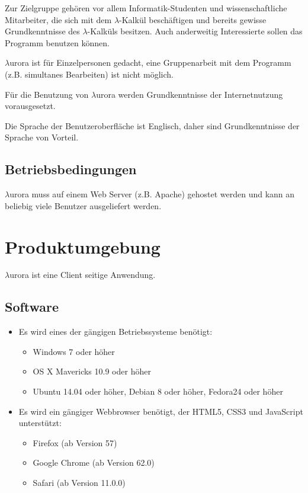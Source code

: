\documentclass[parskip=full,11pt,twoside]{scrartcl}
\begin{document}
Zur Zielgruppe gehören vor allem Informatik-Studenten und wissenschaftliche Mitarbeiter, die sich mit dem $\lambda$-Kalkül beschäftigen und bereits gewisse Grundkenntnisse des $\lambda$-Kalküls besitzen. Auch anderweitig Interessierte sollen das Programm benutzen können.

$\lambda$urora ist für Einzelpersonen gedacht, eine Gruppenarbeit mit dem Programm (z.B. simultanes Bearbeiten) ist nicht möglich.

Für die Benutzung von $\lambda$urora werden Grundkenntnisse der Internetnutzung vorausgesetzt.

Die Sprache der Benutzeroberfläche ist Englisch, daher sind Grundkenntnisse der Sprache von Vorteil.

\subsection{Betriebsbedingungen}

$\lambda$urora muss auf einem Web Server (z.B. Apache) gehostet werden und kann an beliebig viele Benutzer ausgeliefert werden.


\newpage
\section{Produktumgebung}
$\lambda$urora ist eine Client seitige Anwendung.

\subsection{Software}
	\begin{itemize}
		\item Es wird eines der gängigen Betriebssysteme benötigt:
		\begin{itemize}
			\item Windows 7 oder höher
			\item OS X Mavericks 10.9 oder höher
			\item Ubuntu 14.04 oder höher, Debian 8 oder höher, Fedora24 oder höher
		\end{itemize}
		\item Es wird ein gängiger Webbrowser benötigt, der HTML5, CSS3 und JavaScript unterstützt:
			\begin{itemize}
				\item Firefox (ab Version 57)
				\item Google Chrome (ab Version 62.0)
				\item Safari (ab Version 11.0.0)
			\end{itemize}
	\end{itemize}
\end{document}
